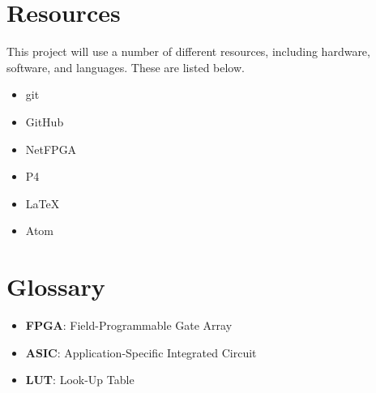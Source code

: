 \documentclass[12pt, a4paper, twoside, onecolumn]{IEEEtran}
\begin{document}
\section{Resources}
\label{resources}
This project will use a number of different resources, including hardware, software, and languages. These are listed below.
\begin{itemize}
  \item git \cite{git}
  \item GitHub \cite{github}
  \item NetFPGA \cite{NetFPGA}
  \item P4 \cite{P4}
  \item LaTeX
  \item Atom
\end{itemize}

\section{Glossary}
\label{glossary}
\begin{itemize}
  \item \textbf{FPGA}: Field-Programmable Gate Array
  \item \textbf{ASIC}: Application-Specific Integrated Circuit
  \item \textbf{LUT}: Look-Up Table
\end{itemize}




\end{document}
